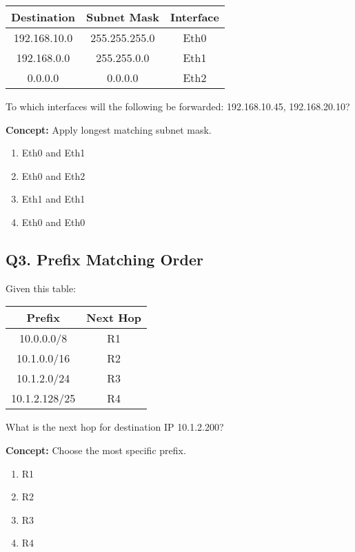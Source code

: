 \begin{table}[H]
\centering
\begin{tabular}{|c|c|c|}
\hline
\textbf{Destination} & \textbf{Subnet Mask} & \textbf{Interface} \\
\hline
192.168.10.0 & 255.255.255.0 & Eth0 \\
192.168.0.0 & 255.255.0.0 & Eth1 \\
0.0.0.0 & 0.0.0.0 & Eth2 \\
\hline
\end{tabular}
\end{table}

To which interfaces will the following be forwarded:
192.168.10.45, 192.168.20.10?

\textbf{Concept:} Apply longest matching subnet mask.

\begin{enumerate}[label=(\alph*)]
\item Eth0 and Eth1 \quad \item Eth0 and Eth2 \quad \item Eth1 and Eth1 \quad \item Eth0 and Eth0
\end{enumerate}


\subsection*{Q3. Prefix Matching Order}
Given this table:

\begin{table}[H]
\centering
\begin{tabular}{|c|c|}
\hline
\textbf{Prefix} & \textbf{Next Hop} \\
\hline
10.0.0.0/8 & R1 \\
10.1.0.0/16 & R2 \\
10.1.2.0/24 & R3 \\
10.1.2.128/25 & R4 \\
\hline
\end{tabular}
\end{table}

What is the next hop for destination IP 10.1.2.200?

\textbf{Concept:} Choose the most specific prefix.

\begin{enumerate}[label=(\alph*)]
\item R1 \quad \item R2 \quad \item R3 \quad \item R4
\end{enumerate}

